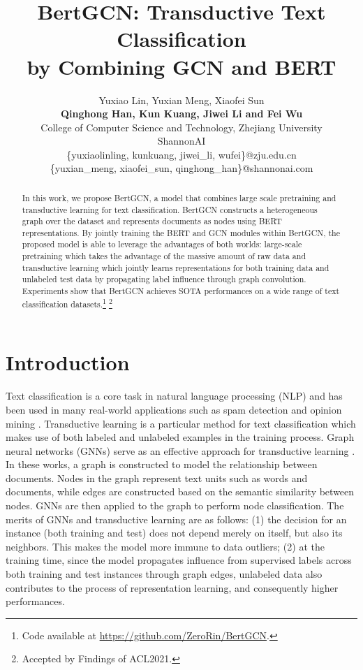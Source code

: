 \documentclass[11pt,a4paper]{article}
\title{BertGCN: Transductive Text Classification \\ by Combining GCN and BERT}
\author{Yuxiao Lin, Yuxian Meng, Xiaofei Sun\\
{\bf Qinghong Han,  Kun Kuang,
Jiwei Li and Fei Wu}\\
College of Computer Science and Technology, Zhejiang University\\ 
 ShannonAI \\
\{yuxiaolinling, kunkuang, jiwei\_li, wufei\}@zju.edu.cn\\
\{yuxian\_meng, xiaofei\_sun, qinghong\_han\}@shannonai.com
}
\begin{document}
\maketitle

\begin{abstract}
In this work, we propose BertGCN, a model that combines large scale pretraining and transductive learning for text classification. BertGCN constructs a  heterogeneous graph over the dataset and represents documents as nodes using BERT representations. By jointly training the BERT and GCN modules within BertGCN, the proposed model is able to leverage the advantages of both worlds: large-scale pretraining which takes the advantage of the massive amount of raw data and transductive learning which jointly learns representations for both training data and unlabeled test data by propagating label influence through graph convolution. Experiments show that BertGCN achieves SOTA performances on a wide range of text classification datasets.\footnote{Code available at \url{https://github.com/ZeroRin/BertGCN}.}
\footnote{Accepted by Findings of ACL2021.}
\end{abstract}


\section{Introduction}
Text classification is a core task in natural language processing (NLP) and has been used in many real-world applications such as spam detection \citep{wang2010don} and opinion mining \citep{bakshi2016opinion}.
Transductive learning \citep{Vapnik1998} is a particular method for text classification which makes use of both labeled and unlabeled  examples in the training process.
Graph neural networks (GNNs) serve as an effective approach for transductive learning \citep{yao2019graph,liu2020tensor}. 
In these works, a graph is constructed to model the relationship between documents. Nodes in the graph represent text units such as words and documents, while edges are constructed based on the semantic similarity between nodes. GNNs are then applied to the graph to perform node classification. 
The merits of GNNs and transductive learning are as follows:
(1) the decision for an instance (both training and test) does not depend merely on itself, but also its neighbors. This makes the model more immune to data outliers; 
(2) at the training time, since the model propagates influence from supervised labels across both training and test instances through graph edges,  unlabeled data also contributes to the process of representation learning, and consequently higher performances.   
\end{document}

